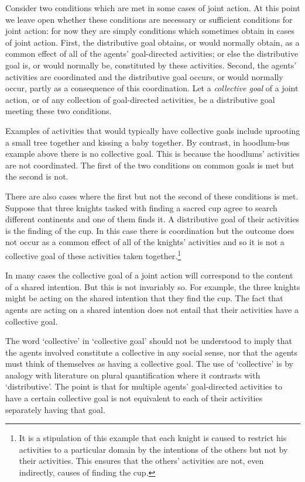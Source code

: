 \documentclass[12pt,a4paper]{extarticle}
\begin{document}
Consider two conditions which are met in some cases of joint action.  At this point we leave open whether these conditions are necessary or sufficient conditions for joint action: for now they are simply conditions which sometimes obtain in cases of joint action.
First, the distributive goal obtains, or would normally obtain, as a common effect of all of the agents' goal-directed activities; or else the distributive goal is, or would normally be, constituted by these activities.  
Second, the agents' activities are coordinated and the distributive goal occurs, or would normally occur, partly as a consequence of this coordination.  Let a \emph{collective goal} of a joint action, or of any collection of goal-directed activities, be a distributive goal meeting these two conditions.

Examples of activities that would typically have collective goals include uprooting a small tree together and kissing a baby together.
By contrast,
in hoodlum-bus example above there is no collective goal.  This is because the hoodlums' activities are not coordinated.  The first of the two conditions on common goals is met but the second is not.  

There are also cases where the first but not the second of these conditions is met.  Suppose that three knights tasked with finding a sacred cup agree to search different continents and one of them finds it.  A distributive goal of their activities is the finding of the cup.  In this case there is coordination but the outcome does not occur as a common effect of all of the knights' activities and so it is not a collective goal of these activities taken together.\footnote
{
It is a stipulation of this example that each knight is caused to restrict his activities to a particular domain by the intentions of the others but not by their activities.  This ensures that the others' activities are not, even indirectly, causes of finding the cup.
}  

In many cases the collective goal of a joint action will correspond to the content of a shared intention.  But this is not invariably so.  For example, the three knights might be acting on the shared intention that they find the cup.  The fact that  agents are acting on a shared intention does not entail that their activities have a collective goal.

The word `collective' in `collective goal' should not be understood to imply that the agents  involved constitute a collective in any social sense, nor that the agents must think of themselves as having a collective goal.  The use of `collective' is by analogy with literature on plural quantification where it contrasts with `distributive'.  The point is that for multiple agents' goal-directed activities to have a certain collective goal is not equivalent to each of their activities separately having that goal.
\end{document}
